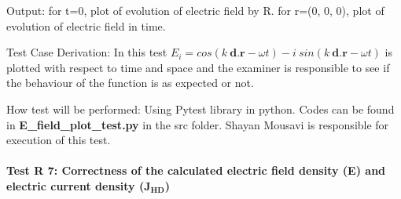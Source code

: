\documentclass[12pt, titlepage]{article}
\begin{document}
\begin{enumerate}
Output: for t=0, plot of evolution of electric field by R. for r=(0, 0, 0), plot of evolution of electric field in time.

Test Case Derivation: In this test $E_i = cos(k\  \textbf{d.} \textbf{r} - \omega t) - i \ sin(k\  \textbf{d.} \textbf{r} - \omega t)$ is plotted with respect to time and space and the examiner is responsible to see if the behaviour of the function is as expected or not.   

How test will be performed: Using Pytest library in python. Codes can be found in \textbf{E\_field\_plot\_test.py } in the src folder. Shayan Mousavi is responsible for execution of this test. 
	
\end{enumerate}

\paragraph{Test R 7: Correctness of the calculated electric field density (E) and electric current density (J$_\textbf{{HD}}$)}
	
\end{document}
